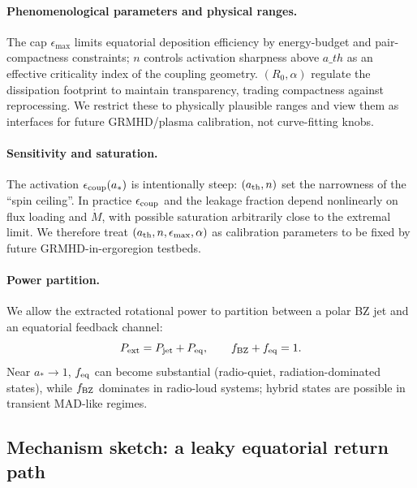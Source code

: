 \documentclass[twocolumn]{aastex701}
\newcommand{\ath}{a_{\rm th}}
\newcommand{\rg}{r_g}
\newcommand{\LEdd}{L_{\rm Edd}}
\newcommand{\Ltot}{L_{\rm tot}}
\newcommand{\FeKa}{\mathrm{Fe\,K}\alpha}
\def\ath{a\_th}\def\rg{r\_g}\def\LEdd{L\_Edd}\def\Ltot{L\_tot}\def\FeKa{Fe K\string\alpha}%
\begin{document}
\paragraph{Phenomenological parameters and physical ranges.}
The cap $\epsilon_{\max}$ limits equatorial deposition efficiency by energy-budget and pair-compactness constraints; $n$ controls activation sharpness above $\ath$ as an effective criticality index of the coupling geometry. $(R_0,\alpha)$ regulate the dissipation footprint to maintain transparency, trading compactness against reprocessing. We restrict these to physically plausible ranges and view them as interfaces for future GRMHD/plasma calibration, not curve-fitting knobs.
\paragraph{Sensitivity and saturation.}
The activation $\epsilon_{\rm coup}(a_*)$ is intentionally steep: $(a_{\rm th},n)$ set the narrowness of the “spin ceiling”. In practice $\epsilon_{\rm coup}$ and the leakage fraction depend nonlinearly on flux loading and $\dot M$, with possible saturation arbitrarily close to the extremal limit. We therefore treat $(a_{\rm th},n,\epsilon_{\max},\alpha)$ as calibration parameters to be fixed by future GRMHD-in-ergoregion testbeds.


\paragraph{Power partition.}
We allow the extracted rotational power to partition between a polar BZ jet and an equatorial feedback channel:
\[
P_{\rm ext}=P_{\rm jet}+P_{\rm eq},\qquad f_{\rm BZ}+f_{\rm eq}=1.
\]
Near $a_*\!\to\!1$, $f_{\rm eq}$ can become substantial (radio-quiet, radiation-dominated states), while $f_{\rm BZ}$ dominates in radio-loud systems; hybrid states are possible in transient MAD-like regimes.
\subsection{Mechanism sketch: a leaky equatorial return path}\label{sec:mech-sketch}
\end{document}
